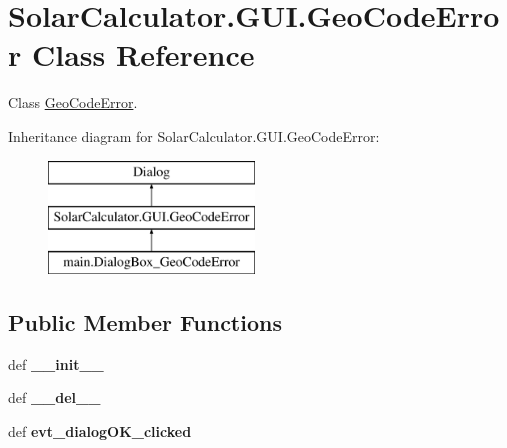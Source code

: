 \hypertarget{class_solar_calculator_1_1_g_u_i_1_1_geo_code_error}{\section{Solar\-Calculator.\-G\-U\-I.\-Geo\-Code\-Error Class Reference}
\label{class_solar_calculator_1_1_g_u_i_1_1_geo_code_error}
}


Class \hyperlink{class_solar_calculator_1_1_g_u_i_1_1_geo_code_error}{Geo\-Code\-Error}.  


Inheritance diagram for Solar\-Calculator.\-G\-U\-I.\-Geo\-Code\-Error\-:\begin{figure}[H]
\begin{center}
\leavevmode
\includegraphics[height=3.000000cm]{class_solar_calculator_1_1_g_u_i_1_1_geo_code_error}
\end{center}
\end{figure}
\subsection*{Public Member Functions}
\begin{DoxyCompactItemize}
\item 
\hypertarget{class_solar_calculator_1_1_g_u_i_1_1_geo_code_error_ac856395a87e8d89c0ad9a0cf545aa1a4}{def {\bfseries \-\_\-\-\_\-init\-\_\-\-\_\-}}\label{class_solar_calculator_1_1_g_u_i_1_1_geo_code_error_ac856395a87e8d89c0ad9a0cf545aa1a4}

\item 
\hypertarget{class_solar_calculator_1_1_g_u_i_1_1_geo_code_error_a2fe041ff7a2e9916339d512be2384611}{def {\bfseries \-\_\-\-\_\-del\-\_\-\-\_\-}}\label{class_solar_calculator_1_1_g_u_i_1_1_geo_code_error_a2fe041ff7a2e9916339d512be2384611}

\item 
\hypertarget{class_solar_calculator_1_1_g_u_i_1_1_geo_code_error_a11596c356200b470fa3f177fcaf3c73a}{def {\bfseries evt\-\_\-dialog\-O\-K\-\_\-clicked}}\label{class_solar_calculator_1_1_g_u_i_1_1_geo_code_error_a11596c356200b470fa3f177fcaf3c73a}

\end{DoxyCompactItemize}
